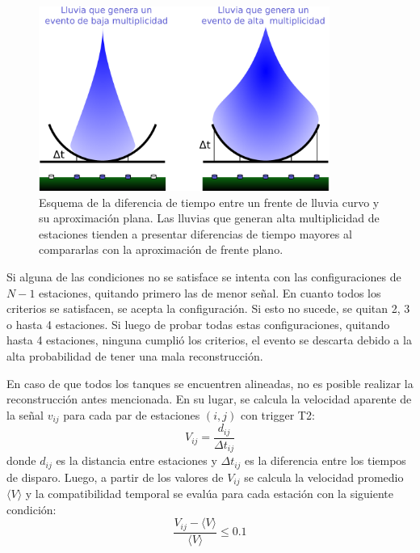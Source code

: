 	\begin{figure}[ht]
	\begin{center}
	\includegraphics[width=0.85\textwidth]{fig/seleccionAuger/plano_vs_curvo.pdf}
	\caption{Esquema de la diferencia de tiempo entre un frente de lluvia curvo y su aproximación plana. 
	Las lluvias que generan alta multiplicidad de estaciones tienden a presentar diferencias de tiempo mayores al compararlas con la aproximación de frente plano.}
	\label{fig:planeFrontAprox}
	\end{center}
	\end{figure}
	Si alguna de las condiciones no se satisface se intenta con las configuraciones de $N-1$ estaciones, quitando primero las de menor señal. 
	En cuanto todos los criterios se satisfacen, se acepta la configuración. Si esto no sucede, se quitan 2, 3 o hasta 4 estaciones.
	Si luego de probar todas estas configuraciones, quitando hasta 4 estaciones, ninguna cumpli\'o los criterios, el evento se descarta debido a la alta probabilidad de tener una mala reconstrucción.
	
	En caso de que todos los tanques se encuentren alineadas, no es posible realizar la reconstrucción antes mencionada.
	En su lugar, se calcula la velocidad aparente de la señal $v_{ij}$ para cada par de estaciones $(i,j)$ con trigger T2:
	\begin{equation}
	 V_{ij}=\frac{d_{ij}}{\Delta t_{ij}}
	\end{equation}
	donde $d_{ij}$ es la distancia entre estaciones y $\Delta t_{ij}$ es la diferencia entre los tiempos de disparo.
	Luego, a partir de los valores de $V_{ij}$ se calcula la velocidad promedio $\langle V\rangle$ y la compatibilidad temporal se eval\'ua para cada estación con la siguiente condición:
	\begin{equation}
	 \frac{V_{ij}-\langle V\rangle}{\langle V\rangle}\leq0.1
	\end{equation}
	

